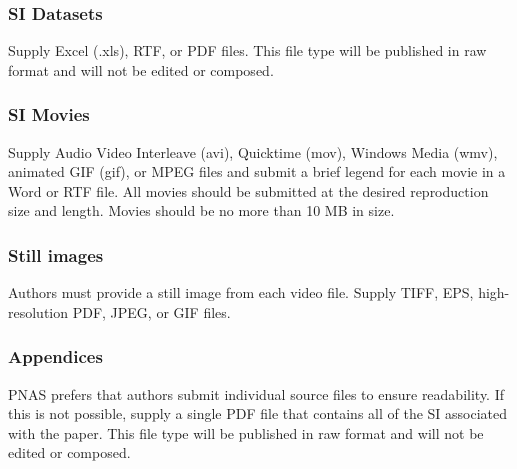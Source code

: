 \documentclass[9pt,twocolumn,twoside]{pnas-new}
\begin{document}
\subsubsection*{SI Datasets} 

Supply Excel (.xls), RTF, or PDF files. This file type will be published in raw format and will not be edited or composed. 

\subsubsection*{SI Movies}

Supply Audio Video Interleave (avi), Quicktime (mov), Windows Media (wmv), animated GIF (gif), or MPEG files and submit a brief legend for each movie in a Word or RTF file. All movies should be submitted at the desired reproduction size and length. Movies should be no more than 10 MB in size. 

\subsubsection*{Still images}

Authors must provide a still image from each video file. Supply TIFF, EPS, high-resolution PDF, JPEG, or GIF files. 

\subsubsection*{Appendices}

PNAS prefers that authors submit individual source files to ensure readability. If this is not possible, supply a single PDF file that contains all of the SI associated with the paper. This file type will be published in raw format and will not be edited or composed.


\showmatmethods{} %


\showacknow{} %



\end{document}
